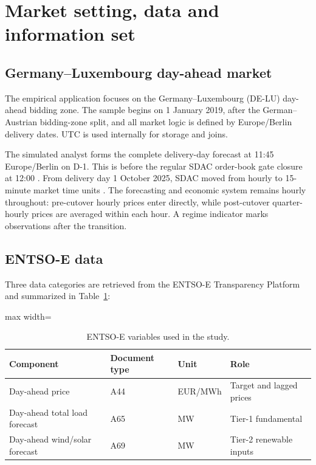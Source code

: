 \section{Market setting, data and information set}
\label{sec:data}

\subsection{Germany--Luxembourg day-ahead market}

The empirical application focuses on the Germany--Luxembourg (DE-LU) day-ahead bidding zone. The sample begins on 1 January 2019, after the German--Austrian bidding-zone split, and all market logic is defined by Europe/Berlin delivery dates. UTC is used internally for storage and joins.

The simulated analyst forms the complete delivery-day forecast at 11:45 Europe/Berlin on D-1. This is before the regular SDAC order-book gate closure at 12:00 \citep{epex2025}. From delivery day 1 October 2025, SDAC moved from hourly to 15-minute market time units \citep{entsoe2025}. The forecasting and economic system remains hourly throughout: pre-cutover hourly prices enter directly, while post-cutover quarter-hourly prices are averaged within each hour. A regime indicator marks observations after the transition.

\subsection{ENTSO-E data}

Three data categories are retrieved from the ENTSO-E Transparency Platform and summarized in Table~\ref{tab:data_sources}:

\begin{table}[htbp]
\centering
\caption{ENTSO-E variables used in the study.}
\label{tab:data_sources}
\begin{adjustbox}{max width=\textwidth}
\begin{tabular}{llll}
\toprule
Component & Document type & Unit & Role \\
\midrule
Day-ahead price & A44 & EUR/MWh & Target and lagged prices \\
Day-ahead total load forecast & A65 & MW & Tier-1 fundamental \\
Day-ahead wind/solar forecast & A69 & MW & Tier-2 renewable inputs \\
\bottomrule
\end{tabular}
\end{adjustbox}
\end{table}

